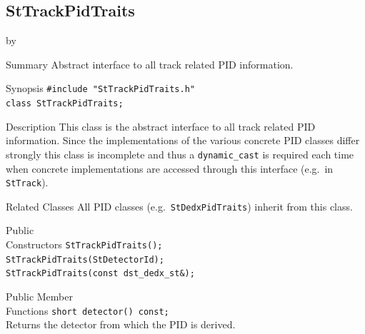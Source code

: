 \documentclass[twoside]{article}
\newcommand{\entrylabel}[1]{\mbox{\textbf{{#1}}}\hfil}%
\newenvironment{entry}
{\begin{list}{}%
    {\renewcommand{\makelabel}{\entrylabel}%
     \setlength{\labelwidth}{90pt}%
     \setlength{\leftmargin}{\labelwidth}
     \advance\leftmargin by \labelsep%
      }%
    }%
  {\end{list}}
\newcommand{\Entrylabel}[1]%
{\raisebox{0pt}[1ex][0pt]{\makebox[\labelwidth][l]%
    {\parbox[t]{\labelwidth}{\hspace{0pt}\textbf{{#1}}}}}}
\newenvironment{Entry}%
{\renewcommand{\entrylabel}{\Entrylabel}\begin{entry}}%
  {\end{entry}}
\begin{document}
\subsection{StTrackPidTraits}
\label{sec:StTrackPidTraits}
\begin{Entry}
\item[Summary] Abstract interface to all track related PID information.
\item[Synopsis]
    \verb+#include "StTrackPidTraits.h"+\\
    \verb+class StTrackPidTraits;+\\

\item[Description]
    This class is the abstract interface to all track related PID
    information. Since the implementations of the various concrete PID
    classes differ strongly this class is incomplete and thus a
    \texttt{dynamic\_cast} is required each time when concrete
    implementations are accessed through this interface (e.g.~in
    \texttt{StTrack}).
    
\item[Related Classes] All PID classes (e.g.~\texttt{StDedxPidTraits})
    inherit from this class.
    
\item[Public\\ Constructors]
    \verb+StTrackPidTraits();+\\
    \verb+StTrackPidTraits(StDetectorId);+\\
    \verb+StTrackPidTraits(const dst_dedx_st&);+\\

\item[Public Member\\ Functions]
    \verb+short detector() const;+\\
    Returns the detector from which the PID is derived.

\end{Entry}
\clearpage
\end{document}
